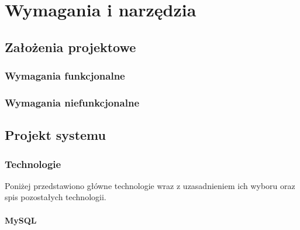 \chapter{Wymagania i narzędzia}
\label{ch:wymagania-i-narzedzia}


\section{Założenia projektowe}


\subsection{Wymagania funkcjonalne}

\subsection{Wymagania niefunkcjonalne}

\section{Projekt systemu}

\subsection{Technologie}

Poniżej przedstawiono główne technologie wraz z uzasadnieniem ich wyboru oraz spis pozostałych technologii.

\subsubsection*{MySQL}

